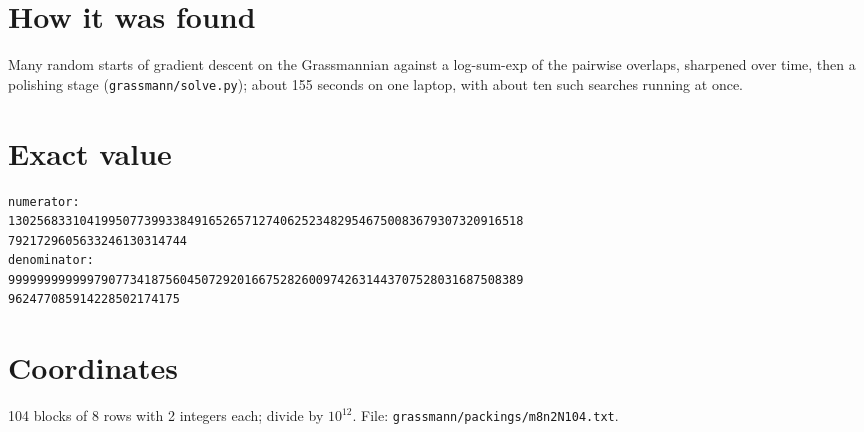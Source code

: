 \documentclass[11pt,a4paper]{article}
\begin{document}
\section{How it was found}
Many random starts of gradient descent on the Grassmannian against a log-sum-exp of the pairwise overlaps, sharpened over time, then a polishing stage (\texttt{grassmann/solve.py}); about 155 seconds on one laptop, with about ten such searches running at once.


\appendix
\section{Exact value}
{\small
\begin{verbatim}
numerator:
130256833104199507739933849165265712740625234829546750083679307320916518
7921729605633246130314744
denominator:
999999999999790773418756045072920166752826009742631443707528031687508389
962477085914228502174175
\end{verbatim}}

\section{Coordinates}
104 blocks of 8 rows with 2 integers each; divide by $10^{12}$. File: \texttt{grassmann/packings/m8n2N104.txt}.
{\tiny
\begin{multicols}{4}
\end{multicols}}
\end{document}
